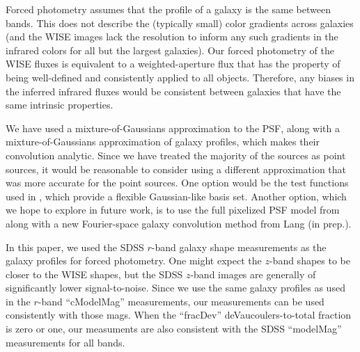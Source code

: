 \documentclass[12pt,preprint]{aastex}
\begin{document}
Forced photometry assumes that the profile of a galaxy is the same
between bands.  This does not describe the (typically small) color
gradients across galaxies (and the WISE images lack the resolution to
inform any such gradients in the infrared colors for all but the
largest galaxies).  Our forced photometry of the WISE fluxes is
equivalent to a weighted-aperture flux that has the property of being
well-defined and consistently applied to all objects.  Therefore, any
biases in the inferred infrared fluxes would be consistent between
galaxies that have the same intrinsic properties.


We have used a mixture-of-Gaussians approximation to the PSF, along
with a mixture-of-Gaussians approximation of galaxy profiles, which
makes their convolution analytic.  Since we have treated the majority
of the sources as point sources, it would be reasonable to consider
using a different approximation that was more accurate for the point
sources.  One option would be the test functions used in \cite{chen},
which provide a flexible Gaussian-like basis set.  Another option,
which we hope to explore in future work, is to use the full pixelized
PSF model from \cite{meisner} along with a new Fourier-space galaxy
convolution method from Lang (in prep.).



In this paper, we used the SDSS $r$-band galaxy shape measurements as
the galaxy profiles for forced photometry.  One might expect the
$z$-band shapes to be closer to the WISE shapes, but the SDSS $z$-band
images are generally of significantly lower signal-to-noise.  Since we
use the same galaxy profiles as used in the $r$-band ``cModelMag''
measurements, our measurements can be used consistently with those
mags.  When the ``fracDev'' deVaucoulers-to-total fraction is zero or
one, our measuments are also consistent with the SDSS ``modelMag''
measurements for all bands.

\end{document}
